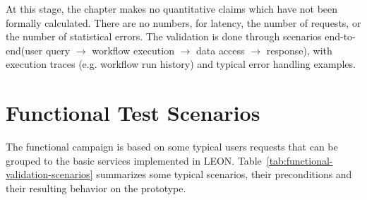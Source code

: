 At this stage, the chapter makes no quantitative claims which have not been formally calculated. There are no numbers, for latency, the number of requests, or the number of statistical errors. The validation is done through scenarios end-to-end(user query $\rightarrow$ workflow execution $\rightarrow$ data access $\rightarrow$ response), with execution traces (e.g. workflow run history) and typical error handling examples.
\section{\textcolor[HTML]{0066CC}{Functional Test Scenarios}}

The functional campaign is based on some typical users requests that can be grouped to the basic services implemented in LEON. Table~\ref{tab:functional-validation-scenarios} summarizes some typical scenarios, their preconditions and their resulting behavior on the prototype.

